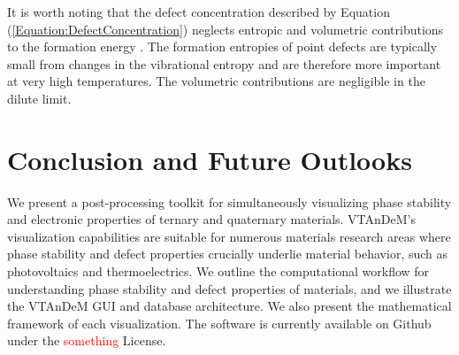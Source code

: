 \documentclass[%
 reprint,
 amsmath,amssymb,
 aps,
]{revtex4-1}
\begin{document}
It is worth noting that the defect concentration described by Equation (\ref{Equation:DefectConcentration}) neglects entropic and volumetric contributions to the formation energy \cite{2007_Janotti}. The formation entropies of point defects are typically small from changes in the vibrational entropy and are therefore more important at very high temperatures. The volumetric contributions are negligible in the dilute limit.








\section{Conclusion and Future Outlooks} \label{Section_Conclusion}
We present a post-processing toolkit for simultaneously visualizing phase stability and electronic properties of ternary and quaternary materials. VTAnDeM's visualization capabilities are suitable for numerous materials research areas where phase stability and defect properties crucially underlie material behavior, such as photovoltaics and thermoelectrics. We outline the computational workflow for understanding phase stability and defect properties of materials, and we illustrate the VTAnDeM GUI and database architecture. We also present the mathematical framework of each visualization. The software is currently available on Github under the \textcolor{red}{something} License.
\end{document}
